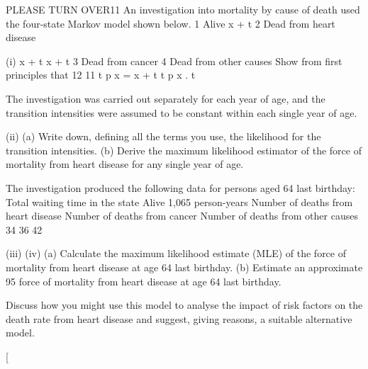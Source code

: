 PLEASE TURN OVER11
An investigation into mortality by cause of death used the four-state Markov model
shown below.
1 Alive
x + t
2 Dead from
heart disease
\item (i)
x + t
x + t
3 Dead from
cancer
4 Dead from
other causes
Show from first principles that
12
11
t p x = \mu x + t t p x .
\partial t

The investigation was carried out separately for each year of age, and the transition
intensities were assumed to be constant within each single year of age.
\item (ii)
(a) Write down, defining all the terms you use, the likelihood for the
transition intensities.
(b) Derive the maximum likelihood estimator of the force of mortality
from heart disease for any single year of age.

The investigation produced the following data for persons aged 64 last birthday:
Total waiting time in the state Alive 1,065 person-years
Number of deaths from heart disease
Number of deaths from cancer
Number of deaths from other causes 34
36
42
\item (iii)
(iv)
(a) Calculate the maximum likelihood estimate (MLE) of the force of
mortality from heart disease at age 64 last birthday.
(b) Estimate an approximate 95%
force of mortality from heart disease at age 64 last birthday.

Discuss how you might use this model to analyse the impact of risk factors on
the death rate from heart disease and suggest, giving reasons, a suitable
alternative model.

[


